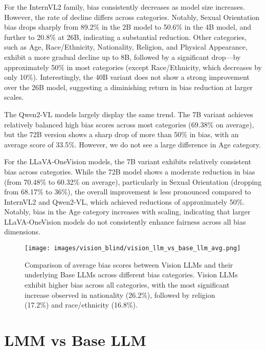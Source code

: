 For the InternVL2 family, bias consistently decreases as model size increases. However, the rate of decline differs across categories. Notably, Sexual Orientation bias drops sharply from 89.2\% in the 2B model to 50.6\% in the 4B model, and further to 20.8\% at 26B, indicating a substantial reduction. Other categories, such as Age, Race/Ethnicity, Nationality, Religion, and Physical Appearance, exhibit a more gradual decline up to 8B, followed by a significant drop—by approximately 50\% in most categories (except Race/Ethnicity, which decreases by only 10\%). Interestingly, the 40B variant does not show a strong improvement over the 26B model, suggesting a diminishing return in bias reduction at larger scales.

The Qwen2-VL models largely display the same trend. The 7B variant achieves relatively balanced high bias scores across most categories (69.38\% on average), but the 72B version shows a sharp drop of more than 50\% in bias, with an average score of 33.5\%. However, we do not see a large difference in Age category.

For the LLaVA-OneVision models, the 7B variant exhibits relatively consistent bias across categories. While the 72B model shows a moderate reduction in bias (from 70.48\% to 60.32\% on average), particularly in Sexual Orientation (dropping from 68.17\% to 36\%), the overall improvement is less pronounced compared to InternVL2 and Qwen2-VL, which achieved reductions of approximately 50\%. Notably, bias in the Age category increases with scaling, indicating that larger LLaVA-OneVision models do not consistently enhance fairness across all bias dimensions.


\begin{figure}[t]
    \centering
    \hspace{-0.1cm}
    \texttt{[image: images/vision\_blind/vision\_llm\_vs\_base\_llm\_avg.png]}
    \caption{Comparison of average bias scores between Vision LLMs and their underlying Base LLMs across different bias categories. Vision LLMs exhibit higher bias across all categories, with the most significant increase observed in nationality (26.2\%), followed by religion (17.2\%) and race/ethnicity (16.8\%).}
    \vspace{-1em}
\label{fig:underlying_llm_vs_mllm_all}
\end{figure}


\section{LMM vs Base LLM}

